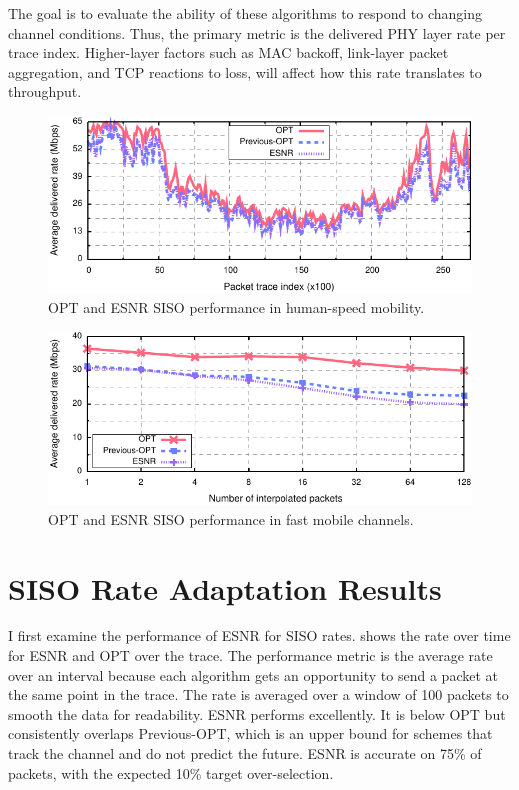 The goal is to evaluate the ability of these algorithms to respond to changing channel conditions. Thus, the primary metric is the delivered PHY layer rate per trace index. Higher-layer factors such as MAC backoff, link-layer packet aggregation, and TCP reactions to loss, will affect how this rate translates to throughput.

\begin{figure}[t]
      \centering
      \includegraphics[width=\textwidth]{figures/rate/siso_rate_time_opt_eff.pdf}
      \caption[OPT and ESNR SISO performance in human-speed mobility]{\label{fig:siso_rate_time_opt_eff} OPT and ESNR SISO performance in human-speed mobility.}
\end{figure}

\begin{figure}[t]
      \centering
      \includegraphics[width=\textwidth]{figures/rate/siso_rate_skip_opt_eff.pdf}
      \caption[OPT and ESNR SISO performance in fast mobile channels]{\label{fig:siso_rate_skip_opt_eff} OPT and ESNR SISO performance in fast mobile channels.}
\end{figure}



\section{SISO Rate Adaptation Results}
I first examine the performance of ESNR for SISO rates.  shows the rate over time for ESNR and OPT over the trace. The performance metric is the average rate over an interval because each algorithm gets an opportunity to send a packet at the same point in the trace. The rate is averaged over a window of 100 packets to smooth the data for readability. ESNR performs excellently. It is below OPT but consistently overlaps Previous-OPT, which is an upper bound for schemes that track the channel and do not predict the future. ESNR is accurate on 75\% of packets, with the expected 10\% target over-selection.

